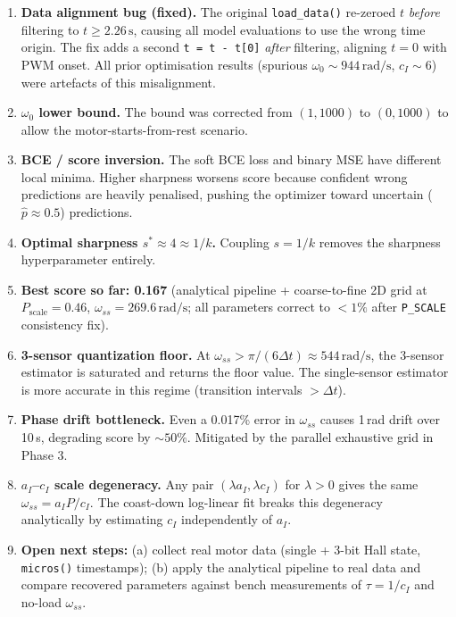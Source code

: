 \documentclass[11pt,a4paper]{article}
\begin{document}
\begin{enumerate}
  \item \textbf{Data alignment bug (fixed).}  The original \texttt{load\_data()}
        re-zeroed $t$ \emph{before} filtering to $t\geq 2.26\,\text{s}$,
        causing all model evaluations to use the wrong time origin.  The fix
        adds a second \texttt{t = t - t[0]} \emph{after} filtering, aligning
        $t=0$ with PWM onset.  All prior optimisation results (spurious
        $\omega_0 \sim 944\,\text{rad/s}$, $c_I \sim 6$) were artefacts of
        this misalignment.
  \item \textbf{$\omega_0$ lower bound.}  The bound was corrected from
        $(1,1000)$ to $(0,1000)$ to allow the motor-starts-from-rest scenario.
  \item \textbf{BCE / score inversion.}  The soft BCE loss and binary MSE
        have different local minima.  Higher sharpness worsens score because
        confident wrong predictions are heavily penalised, pushing the
        optimizer toward uncertain ($\hat{p}\approx 0.5$) predictions.
  \item \textbf{Optimal sharpness $s^*\approx 4 \approx 1/k$.}  Coupling
        $s=1/k$ removes the sharpness hyperparameter entirely.
  \item \textbf{Best score so far: 0.167} (analytical pipeline +
        coarse-to-fine 2D grid at $P_{\text{scale}}=0.46$,
        $\omega_{ss}=269.6\,\text{rad/s}$; all parameters correct to
        $<1\%$ after \texttt{P\_SCALE} consistency fix).
  \item \textbf{3-sensor quantization floor.}  At $\omega_{ss} > \pi/(6\Delta t)
        \approx 544\,\text{rad/s}$, the 3-sensor estimator is saturated and
        returns the floor value.  The single-sensor estimator is more accurate
        in this regime (transition intervals $> \Delta t$).
  \item \textbf{Phase drift bottleneck.}  Even a 0.017\% error in $\omega_{ss}$
        causes 1\,rad drift over 10\,s, degrading score by $\sim 50\%$.
        Mitigated by the parallel exhaustive grid in Phase 3.
  \item \textbf{$a_I$--$c_I$ scale degeneracy.}
        Any pair $(\lambda a_I, \lambda c_I)$ for $\lambda>0$ gives the same
        $\omega_{ss} = a_IP/c_I$.  The coast-down log-linear fit breaks this
        degeneracy analytically by estimating $c_I$ independently of $a_I$.
  \item \textbf{Open next steps:}
        (a) collect real motor data (single + 3-bit Hall state, \texttt{micros()} timestamps);
        (b) apply the analytical pipeline to real data and compare recovered
            parameters against bench measurements of $\tau = 1/c_I$ and
            no-load $\omega_{ss}$.
\end{enumerate}
\end{document}
